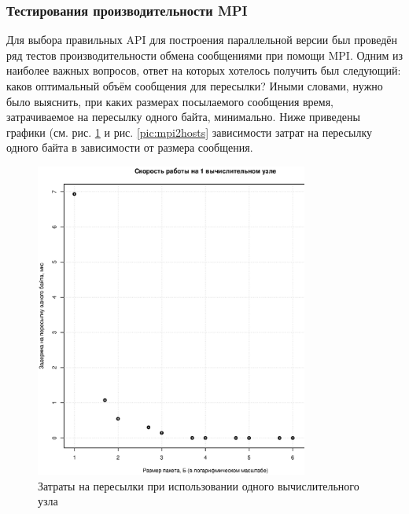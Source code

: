 \subsubsection{Тестирования производительности MPI}
Для выбора правильных API для построения параллельной версии был проведён ряд тестов производительности обмена сообщениями при помощи MPI. Одним из наиболее важных вопросов, ответ на которых хотелось получить был следующий: каков оптимальный объём сообщения для пересылки? Иными словами, нужно было выяснить, при каких размерах посылаемого сообщения время, затрачиваемое на пересылку одного байта, минимально.
Ниже приведены графики (см. рис. \ref{pic:mpi1host} и рис. \ref{pic:mpi2hosts} зависимости затрат на пересылку одного байта в зависимости от размера сообщения.
\begin{figure}[htp]
\centering
\includegraphics[width=0.8\textwidth]{eps/mpi-1host.eps}
\caption{Затраты на пересылки при использовании одного вычислительного
 узла}
\label{pic:mpi1host}
\end{figure}
